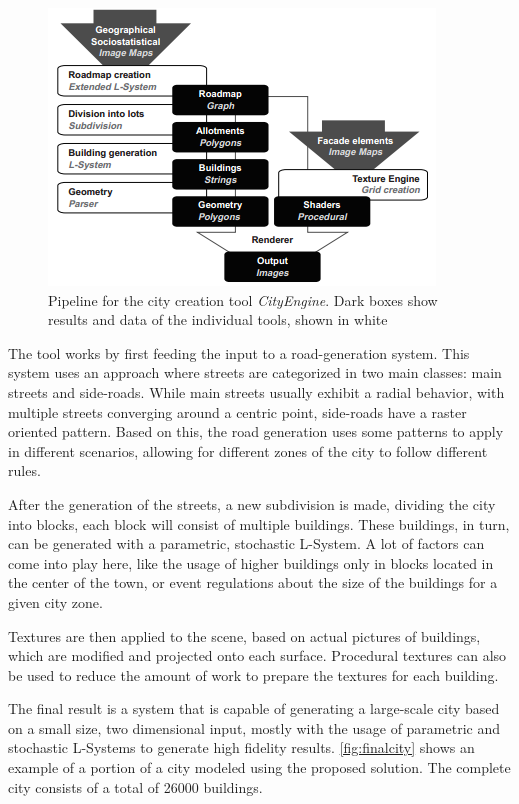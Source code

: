 \documentclass{acmtog}
\begin{document}
\begin{figure}[!htp]
  \begin{center}
    \includegraphics[width=0.8\columnwidth]{images/9_cities}
    \caption{Pipeline for the city creation tool \emph{CityEngine}. Dark boxes show results and data of the individual tools, shown in white \label{fig:cities}}
    \end{center}
\end{figure}

The tool works by first feeding the input to a road-generation system. This system uses an approach where streets are categorized in two main classes: main streets and side-roads. While main streets usually exhibit a radial behavior, with multiple streets converging around a centric point, side-roads have a raster oriented pattern. Based on this, the road generation uses some patterns to apply in different scenarios, allowing for different zones of the city to follow different rules.

After the generation of the streets, a new subdivision is made, dividing the city into blocks, each block will consist of multiple buildings. These buildings, in turn, can be generated with a parametric, stochastic L-System. A lot of factors can come into play here, like the usage of higher buildings only in blocks located in the center of the town, or event regulations about the size of the buildings for a given city zone.

Textures are then applied to the scene, based on actual pictures of buildings, which are modified and projected onto each surface. Procedural textures can also be used to reduce the amount of work to prepare the textures for each building.

The final result is a system that is capable of generating a large-scale city based on a small size, two dimensional input, mostly with the usage of parametric and stochastic L-Systems to generate high fidelity results. \autoref{fig:finalcity} shows an example of a portion of a city modeled using the proposed solution. The complete city consists of a total of 26000 buildings.
\end{document}
